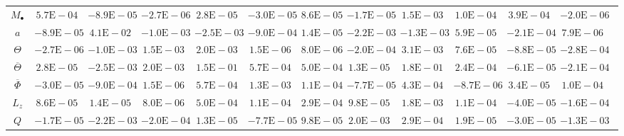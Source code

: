 \begin{sidewaystable}[htbp]\footnotesize
\centering
\begin{tabular}{cD{.}{.}{2.5}D{.}{.}{2.5}D{.}{.}{2.5}D{.}{.}{2.5}D{.}{.}{2.5}D{.}{.}{2.5}D{.}{.}{2.5}D{.}{.}{2.5}D{.}{.}{2.5}D{.}{.}{2.5}D{.}{.}{2.5}c}
\toprule
 &  &  &  &  &  &  &  &  &  &  &  \\ \midrule
$M_\bullet$ & $5.7\mathrm{E}-04$ & $-8.9\mathrm{E}-05$ & $-2.7\mathrm{E}-06$ & $2.8\mathrm{E}-05$ & $-3.0\mathrm{E}-05$ & $8.6\mathrm{E}-05$ & $-1.7\mathrm{E}-05$ & $1.5\mathrm{E}-03$ & $1.0\mathrm{E}-04$ & $3.9\mathrm{E}-04$ & $-2.0\mathrm{E}-06$ \\
$a$ & $-8.9\mathrm{E}-05$ & $4.1\mathrm{E}-02$ & $-1.0\mathrm{E}-03$ & $-2.5\mathrm{E}-03$ & $-9.0\mathrm{E}-04$ & $1.4\mathrm{E}-05$ & $-2.2\mathrm{E}-03$ & $-1.3\mathrm{E}-03$ & $5.9\mathrm{E}-05$ & $-2.1\mathrm{E}-04$ & $7.9\mathrm{E}-06$ \\
$\Theta$ & $-2.7\mathrm{E}-06$ & $-1.0\mathrm{E}-03$ & $1.5\mathrm{E}-03$ & $2.0\mathrm{E}-03$ & $1.5\mathrm{E}-06$ & $8.0\mathrm{E}-06$ & $-2.0\mathrm{E}-04$ & $3.1\mathrm{E}-03$ & $7.6\mathrm{E}-05$ & $-8.8\mathrm{E}-05$ & $-2.8\mathrm{E}-04$ \\
$\overline{\Theta}$ & $2.8\mathrm{E}-05$ & $-2.5\mathrm{E}-03$ & $2.0\mathrm{E}-03$ & $1.5\mathrm{E}-01$ & $5.7\mathrm{E}-04$ & $5.0\mathrm{E}-04$ & $1.3\mathrm{E}-05$ & $1.8\mathrm{E}-01$ & $2.4\mathrm{E}-04$ & $-6.1\mathrm{E}-05$ & $-2.1\mathrm{E}-04$ \\
$\overline{\Phi}$ & $-3.0\mathrm{E}-05$ & $-9.0\mathrm{E}-04$ & $1.5\mathrm{E}-06$ & $5.7\mathrm{E}-04$ & $1.3\mathrm{E}-03$ & $1.1\mathrm{E}-04$ & $-7.7\mathrm{E}-05$ & $4.3\mathrm{E}-04$ & $-8.7\mathrm{E}-06$ & $3.4\mathrm{E}-05$ & $1.0\mathrm{E}-04$ \\
$L_z$ & $8.6\mathrm{E}-05$ & $1.4\mathrm{E}-05$ & $8.0\mathrm{E}-06$ & $5.0\mathrm{E}-04$ & $1.1\mathrm{E}-04$ & $2.9\mathrm{E}-04$ & $9.8\mathrm{E}-05$ & $1.8\mathrm{E}-03$ & $1.1\mathrm{E}-04$ & $-4.0\mathrm{E}-05$ & $-1.6\mathrm{E}-04$ \\
$Q$ & $-1.7\mathrm{E}-05$ & $-2.2\mathrm{E}-03$ & $-2.0\mathrm{E}-04$ & $1.3\mathrm{E}-05$ & $-7.7\mathrm{E}-05$ & $9.8\mathrm{E}-05$ & $2.0\mathrm{E}-03$ & $2.9\mathrm{E}-04$ & $1.9\mathrm{E}-05$ & $-3.0\mathrm{E}-05$ & $-1.3\mathrm{E}-03$ \\

\end{tabular}
\end{sidewaystable}
